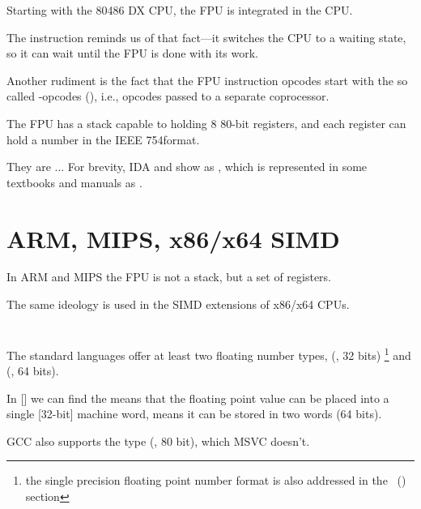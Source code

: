 Starting with the 80486 DX CPU, the \ac{FPU} is integrated in the \ac{CPU}.

The  instruction reminds us of that fact---it switches the \ac{CPU} to a waiting state, so it can wait until the \ac{FPU} is done with its work.

Another rudiment is the fact that the \ac{FPU} instruction 
opcodes start with the so called -opcodes (), i.e., 
opcodes passed to a separate coprocessor.

\label{FPU_is_stack}

The FPU has a stack capable to holding 8 80-bit registers, and each register can hold a number 
in the IEEE 754\FNURLIEEE format.

They are ... For brevity, IDA and \olly show  as , 
which is represented in some textbooks and manuals as .

\section{ARM, MIPS, x86/x64 SIMD}

In ARM and MIPS the FPU is not a stack, but a set of registers.

The same ideology is used in the SIMD extensions of x86/x64 CPUs.

\section{\CCpp}


The standard \CCpp languages offer at least two floating number types, \Tfloat (\FNURLSP, 32 bits)
\footnote{the single precision floating point number format is also addressed in 
the \IT{\WorkingWithFloatAsWithStructSubSubSectionName}~() section}
and \Tdouble (\FNURLDP, 64 bits).

In [] we can find the  means that the floating point value can be placed into a single
[32-bit] machine word,  means it can be stored in two words (64 bits).


GCC also supports the  type (\FNURLEP, 80 bit), which MSVC doesn't.

